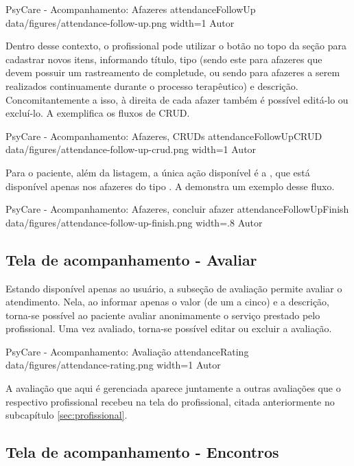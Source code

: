 \image
    {PsyCare - Acompanhamento: Afazeres}
    {attendanceFollowUp}
    {data/figures/attendance-follow-up.png}
    {width=1\textwidth}
    {Autor}

Dentro desse contexto, o profissional pode utilizar o botão  no topo da seção para cadastrar novos itens, informando título, tipo (sendo este  para afazeres que devem possuir um rastreamento de completude, ou sendo  para afazeres a serem realizados continuamente durante o processo terapêutico) e descrição. Concomitantemente a isso, à direita de cada afazer também é possível editá-lo ou excluí-lo. A  exemplifica os fluxos de CRUD.

\image
    {PsyCare - Acompanhamento: Afazeres, CRUDs}
    {attendanceFollowUpCRUD}
    {data/figures/attendance-follow-up-crud.png}
    {width=1\textwidth}
    {Autor}

Para o paciente, além da listagem, a única ação disponível é a , que está disponível apenas nos afazeres do tipo . A  demonstra um exemplo desse fluxo.

\image
    {PsyCare - Acompanhamento: Afazeres, concluir afazer}
    {attendanceFollowUpFinish}
    {data/figures/attendance-follow-up-finish.png}
    {width=.8\textwidth}
    {Autor}

\subsection{Tela de acompanhamento - Avaliar}
\label{sec:acompanhamentoAvaliar}

Estando disponível apenas ao usuário, a subseção de avaliação permite avaliar o atendimento. Nela, ao informar apenas o valor (de um a cinco) e a descrição, torna-se possível ao paciente avaliar anonimamente o serviço prestado pelo profissional. Uma vez avaliado, torna-se possível editar ou excluir a avaliação.

\image
    {PsyCare - Acompanhamento: Avaliação}
    {attendanceRating}
    {data/figures/attendance-rating.png}
    {width=1\textwidth}
    {Autor}

A avaliação que aqui é gerenciada aparece juntamente a outras avaliações que o respectivo profissional recebeu na tela do profissional, citada anteriormente no subcapítulo \ref{sec:profissional}.

\subsection{Tela de acompanhamento - Encontros}
\label{sec:acompanhamentoEncontros}


